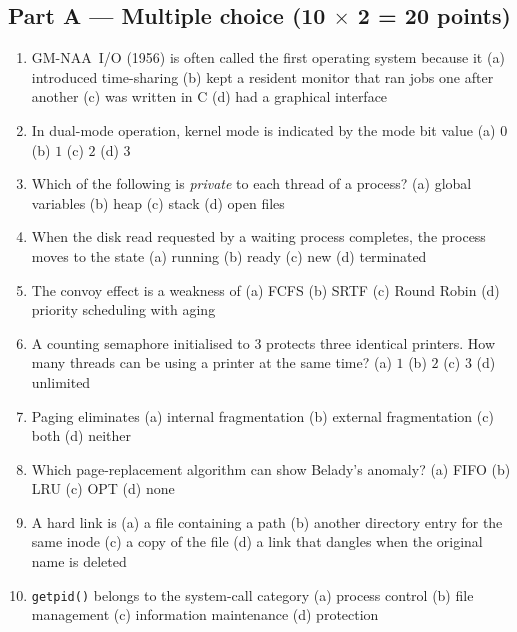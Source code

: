 \documentclass[11pt,a4paper]{article}
\newcommand{\cmd}[1]{\texttt{#1}}
\begin{document}
\subsection*{Part A --- Multiple choice \hfill (10 $\times$ 2 = 20 points)}
\begin{enumerate}[leftmargin=2.0em,label=A\arabic*.,itemsep=0.3em]
  \item GM-NAA~I/O (1956) is often called the first operating system because it \quad (a) introduced time-sharing \quad (b) kept a resident monitor that ran jobs one after another \quad (c) was written in C \quad (d) had a graphical interface
  \item In dual-mode operation, kernel mode is indicated by the mode bit value \quad (a) $0$ \quad (b) $1$ \quad (c) $2$ \quad (d) $3$
  \item Which of the following is \emph{private} to each thread of a process? \quad (a) global variables \quad (b) heap \quad (c) stack \quad (d) open files
  \item When the disk read requested by a waiting process completes, the process moves to the state \quad (a) running \quad (b) ready \quad (c) new \quad (d) terminated
  \item The convoy effect is a weakness of \quad (a) FCFS \quad (b) SRTF \quad (c) Round Robin \quad (d) priority scheduling with aging
  \item A counting semaphore initialised to $3$ protects three identical printers. How many threads can be using a printer at the same time? \quad (a) $1$ \quad (b) $2$ \quad (c) $3$ \quad (d) unlimited
  \item Paging eliminates \quad (a) internal fragmentation \quad (b) external fragmentation \quad (c) both \quad (d) neither
  \item Which page-replacement algorithm can show Belady's anomaly? \quad (a) FIFO \quad (b) LRU \quad (c) OPT \quad (d) none
  \item A hard link is \quad (a) a file containing a path \quad (b) another directory entry for the same inode \quad (c) a copy of the file \quad (d) a link that dangles when the original name is deleted
  \item \cmd{getpid()} belongs to the system-call category \quad (a) process control \quad (b) file management \quad (c) information maintenance \quad (d) protection
\end{enumerate}
\end{document}
